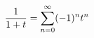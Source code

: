 \documentclass[preview]{standalone}
\begin{document}
\begin{align*}
\special{dvisvgm:raw <g id='unique000'>}\dfrac{1}{1+t}=\displaystyle\sum_{n=0}^{\infty}(-1)^nt^{n}\special{dvisvgm:raw </g>}
\end{align*}
\end{document}
